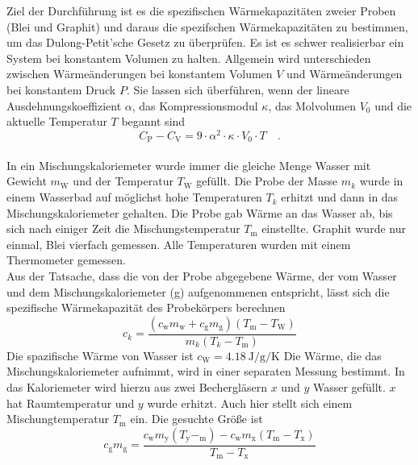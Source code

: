 Ziel der Durchführung ist es die spezifischen Wärmekapazitäten zweier Proben (Blei und Graphit) und daraus  die spezifschen Wärmekapazitäten zu bestimmen, um das Dulong-Petit'sche Gesetz zu überprüfen.
Es ist es schwer realisierbar ein System bei konstantem Volumen zu halten. Allgemein wird unterschieden zwischen Wärmeänderungen bei konstantem Volumen $V$ und Wärmeänderungen bei konstantem Druck $P$. Sie lassen sich überführen, wenn der lineare Ausdehnungskoeffizient $\alpha$, das Kompressionsmodul $\kappa$, das Molvolumen $V_0$ und die aktuelle Temperatur $T$ begannt sind
\begin{equation}
  C_\text{P} - C_\text{V} = 9 \cdot \alpha^2 \cdot \kappa \cdot V_0 \cdot T \quad.
\end{equation}  \\
In ein Mischungskaloriemeter wurde immer die gleiche Menge Wasser mit Gewicht $m_\text{W}$ und der Temperatur $T_\text{W}$ gefüllt.
Die Probe der Masse $m_k$ wurde in einem Wasserbad auf möglichst hohe Temperaturen $T_k$ erhitzt und dann in das Mischungskaloriemeter gehalten. Die Probe gab Wärme an das Wasser ab, bis sich nach einiger Zeit die Mischungstemperatur $T_\text{m}$ einstellte. Graphit wurde nur einmal, Blei vierfach gemessen. Alle Temperaturen wurden mit einem Thermometer gemessen.
\\
Aus der Tatsache, dass die von der Probe abgegebene Wärme, der vom Wasser und dem Mischungskaloriemeter (g) aufgenommenen entspricht, lässt sich die spezifische Wärmekapazität des Probekörpers berechnen
\begin{equation}
  c_k = \frac{(c_\text{w} m_\text{w} + c_\text{g} m_\text{g})(T_\text{m} - T_\text{W})}{m_k (T_k - T_\text{m})}
\end{equation}
Die spazifische Wärme von Wasser ist $c_\text{W} = \SI{4.18}{\joule\per\gram\per\kelvin}$ Die Wärme, die das Mischungskaloriemeter aufnimmt, wird in einer separaten Messung bestimmt. In das Kaloriemeter wird hierzu aus zwei Bechergläsern $x$ und $y$ Wasser gefüllt. $x$ hat Raumtemperatur und $y$ wurde erhitzt. Auch hier stellt sich einem Mischungtemperatur $T_\text{m}$ ein. Die gesuchte Größe ist
\begin{equation}
  c_\text{g} m_\text{g} = \frac{c_\text{w} m_\text{y}(T_\text{y}-_\text{m}) - c_\text{w} m_\text{x}(T_\text{m}-T_\text{x})}{T_\text{m} - T_\text{x}}
\end{equation}
